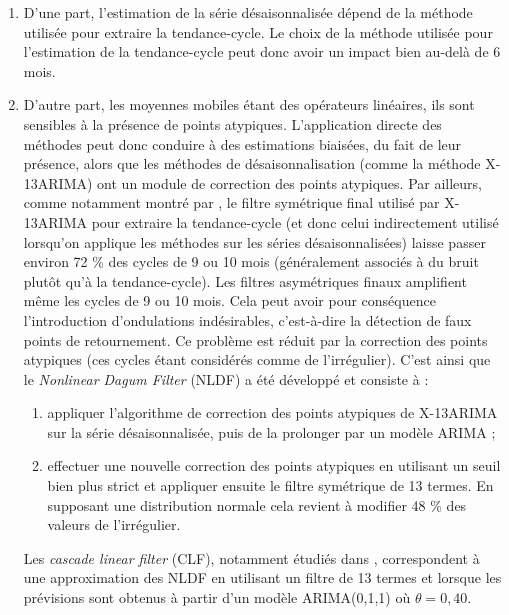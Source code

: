 \documentclass[
  12pt,
  a4paper,french]{article}
\newcommand\1{\mathds{1}}
\begin{document}
\begin{enumerate}
\def\labelenumi{\arabic{enumi}.}
\item
  D'une part, l'estimation de la série désaisonnalisée dépend de la méthode utilisée pour extraire la tendance-cycle.
  Le choix de la méthode utilisée pour l'estimation de la tendance-cycle peut donc avoir un impact bien au-delà de 6 mois.
\item
  D'autre part, les moyennes mobiles étant des opérateurs linéaires, ils sont sensibles à la présence de points atypiques.
  L'application directe des méthodes peut donc conduire à des estimations biaisées, du fait de leur présence, alors que les méthodes de désaisonnalisation (comme la méthode X-13ARIMA) ont un module de correction des points atypiques.
  Par ailleurs, comme notamment montré par \textcite{dagum1996new}, le filtre symétrique final utilisé par X-13ARIMA pour extraire la tendance-cycle (et donc celui indirectement utilisé lorsqu'on applique les méthodes sur les séries désaisonnalisées) laisse passer environ 72 \% des cycles de 9 ou 10 mois (généralement associés à du bruit plutôt qu'à la tendance-cycle).
  Les filtres asymétriques finaux amplifient même les cycles de 9 ou 10 mois.
  Cela peut avoir pour conséquence l'introduction d'ondulations indésirables, c'est-à-dire la détection de faux points de retournement.
  Ce problème est réduit par la correction des points atypiques (ces cycles étant considérés comme de l'irrégulier).
  C'est ainsi que le \emph{Nonlinear Dagum Filter} (NLDF) a été développé et consiste à :

  \begin{enumerate}
  \def\labelenumii{\alph{enumii}.}
  \item
    appliquer l'algorithme de correction des points atypiques de X-13ARIMA sur la série désaisonnalisée, puis de la prolonger par un modèle ARIMA ;
  \item
    effectuer une nouvelle correction des points atypiques en utilisant un seuil bien plus strict et appliquer ensuite le filtre symétrique de 13 termes.
    En supposant une distribution normale cela revient à modifier 48 \% des valeurs de l'irrégulier.
  \end{enumerate}

  Les \emph{cascade linear filter} (CLF), notamment étudiés dans \textcite{dagumBianconcini2023}, correspondent à une approximation des NLDF en utilisant un filtre de 13 termes et lorsque les prévisions sont obtenus à partir d'un modèle ARIMA(0,1,1) où \(\theta=0,40.\)
\end{enumerate}
\end{document}
